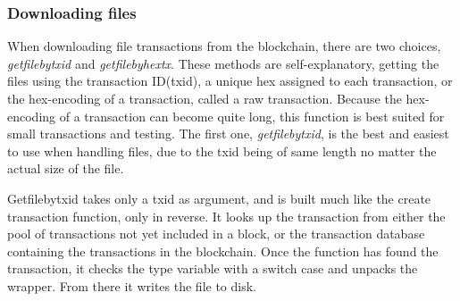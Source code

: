 \documentclass[12pt]{article}
\begin{document}
\subsubsection{Downloading files}
When downloading file transactions from the blockchain, there are two choices, \textit{getfilebytxid} and \textit{getfilebyhextx}. These methods are self-explanatory, getting the files using the transaction ID(txid), a unique hex assigned to each transaction, or the hex-encoding of a transaction, called a raw transaction.  Because the hex-encoding of a transaction can become quite long, this function is best suited for small transactions and testing. The first one, \textit{getfilebytxid}, is the best and easiest to use when handling files, due to the txid being of same length no matter the actual size of the file. 

Getfilebytxid takes only a txid as argument, and is built much like the create transaction function, only in reverse. It looks up the transaction from either the pool of transactions not yet included in a block, or the transaction database containing the transactions in the blockchain. Once the function has found the transaction, it checks the type variable with a switch case and unpacks the wrapper. From there it writes the file to disk. 
\end{document}
